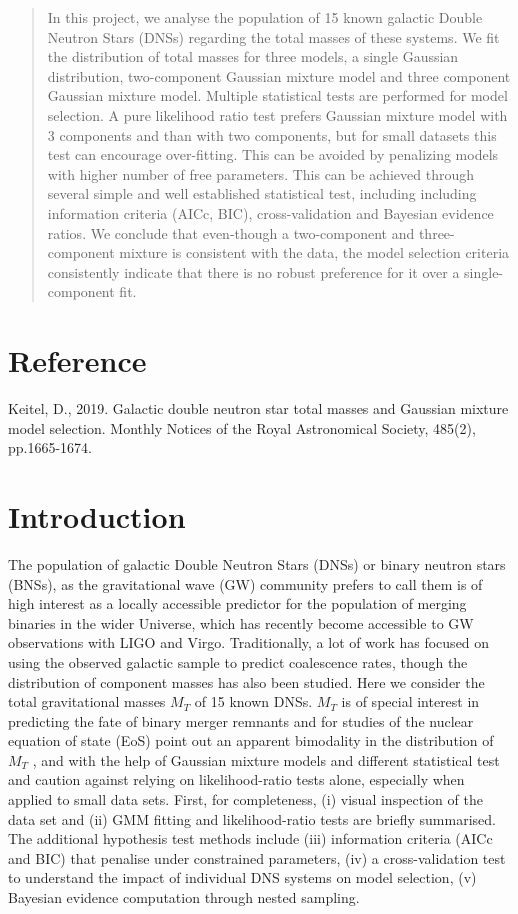 \documentclass[journal,12pt,twocolumn]{IEEEtran}
\begin{document}
\begin{abstract}
In this project, we analyse the population of 15 known galactic Double Neutron Stars (DNSs) regarding the total masses of these systems. We fit the distribution of total masses for three models, a single Gaussian distribution, two-component Gaussian mixture model and three component Gaussian mixture model. Multiple statistical tests are performed for model selection. A pure likelihood ratio test prefers Gaussian mixture model with 3 components and than with two components, but for small datasets this test can encourage over-fitting. This can be avoided by penalizing models with higher number of free parameters. This can be achieved through several simple and well established statistical test, including including information criteria (AICc, BIC), cross-validation and Bayesian evidence ratios. We conclude that even-though a two-component and three-component mixture is consistent with the data, the model selection criteria consistently indicate that there is no robust preference for it over a single-component fit.\end{abstract}
\tableofcontents
\section{Reference}
Keitel, D., 2019. Galactic double neutron star total masses and Gaussian mixture model selection. Monthly Notices of the Royal Astronomical Society, 485(2), pp.1665-1674.
\section{Introduction}
The population of galactic Double Neutron Stars (DNSs) or binary neutron stars (BNSs), as the gravitational wave (GW) community prefers to call them is of high interest as a locally accessible predictor for the population of merging binaries in the wider Universe, which has recently become accessible to GW observations with LIGO and Virgo. Traditionally, a lot of work has focused on using the observed galactic sample to predict coalescence rates, though the distribution of component masses has also been studied. Here we consider the total gravitational masses $M_{T}$ of 15 known DNSs. $M_{T}$ is of special interest in predicting the fate of binary merger remnants and for studies of the nuclear equation of state (EoS) point out an apparent bimodality in the distribution of $M_{T}$ , and with the help of Gaussian mixture models and different statistical test and caution against relying on likelihood-ratio tests alone, especially when applied to small data sets. First, for completeness, (i) visual inspection of the data set and (ii) GMM fitting and likelihood-ratio tests are briefly summarised. The additional hypothesis test methods include (iii) information criteria (AICc and BIC) that penalise under constrained parameters, (iv) a cross-validation test to understand the impact of individual DNS systems on model selection, (v) Bayesian evidence computation through nested sampling.
\end{document}

